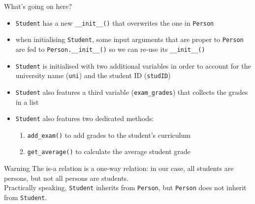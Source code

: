 \documentclass[t,handout,9pt]{beamer}
\begin{document}
\begin{frame}
\vfill
What's going on here?
\begin{itemize}
	\item \texttt{Student} has a new \texttt{\_\_init\_\_()} that overwrites the one in \texttt{Person}
	\item when initialising \texttt{Student}, some input arguments that are proper to \texttt{Person} are fed to \texttt{Person.\_\_init\_\_()} so we can re-use its \texttt{\_\_init\_\_()}
	\item \texttt{Student} is initialised with two additional variables in order to account for the university name (\texttt{uni}) and the student ID (\texttt{studID})
	\item \texttt{Student} also features a third variable (\texttt{exam\_grades}) that collects the grades in a list
	\item \texttt{Student} also features two dedicated methods:
	\begin{enumerate}
		\item \texttt{add\_exam()} to add grades to the student's curriculum
		\item \texttt{get\_average()} to calculate the average student grade
	\end{enumerate}
\end{itemize}
\begin{block}{Warning}
The is-a relation is a one-way relation: in our case, all students are persons, but not all persons are students.\\
Practically speaking, \texttt{Student} inherits from \texttt{Person}, but \texttt{Person} does not inherit from \texttt{Student}.
\end{block}
\vfill
\end{frame}
%
\end{document}
